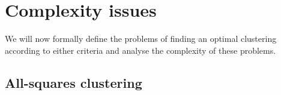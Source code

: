 


\section{Complexity issues}
\label{sec:complexity-issues}

We will now formally define the problems of finding an optimal clustering
according to either criteria and analyse the complexity of these problems.

\subsection{All-squares clustering}
\label{sec:all-squar-clust}

